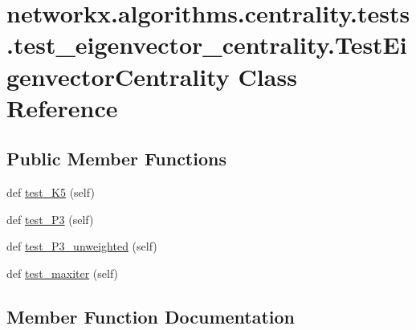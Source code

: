\hypertarget{classnetworkx_1_1algorithms_1_1centrality_1_1tests_1_1test__eigenvector__centrality_1_1TestEigenvectorCentrality}{}\section{networkx.\+algorithms.\+centrality.\+tests.\+test\+\_\+eigenvector\+\_\+centrality.\+Test\+Eigenvector\+Centrality Class Reference}
\label{classnetworkx_1_1algorithms_1_1centrality_1_1tests_1_1test__eigenvector__centrality_1_1TestEigenvectorCentrality}
\subsection*{Public Member Functions}
\begin{DoxyCompactItemize}
\item 
def \hyperlink{classnetworkx_1_1algorithms_1_1centrality_1_1tests_1_1test__eigenvector__centrality_1_1TestEigenvectorCentrality_a4b5a2224faf89abbb0be86eb5d955dce}{test\+\_\+\+K5} (self)
\item 
def \hyperlink{classnetworkx_1_1algorithms_1_1centrality_1_1tests_1_1test__eigenvector__centrality_1_1TestEigenvectorCentrality_a58478747acedca814f2c85417689457c}{test\+\_\+\+P3} (self)
\item 
def \hyperlink{classnetworkx_1_1algorithms_1_1centrality_1_1tests_1_1test__eigenvector__centrality_1_1TestEigenvectorCentrality_a480cc55e5c0415c37df0156370857bf8}{test\+\_\+\+P3\+\_\+unweighted} (self)
\item 
def \hyperlink{classnetworkx_1_1algorithms_1_1centrality_1_1tests_1_1test__eigenvector__centrality_1_1TestEigenvectorCentrality_ae0ea5e1ab2512d7ed4590a024d2ed805}{test\+\_\+maxiter} (self)
\end{DoxyCompactItemize}


\subsection{Member Function Documentation}
\mbox{\label{classnetworkx_1_1algorithms_1_1centrality_1_1tests_1_1test__eigenvector__centrality_1_1TestEigenvectorCentrality_a4b5a2224faf89abbb0be86eb5d955dce}} 
